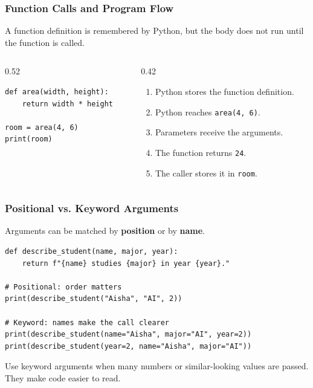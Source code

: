 \documentclass[aspectratio=169,10pt]{beamer}
\newcommand{\keyword}[1]{\textcolor{PrimaryBlue}{\textbf{#1}}}
\begin{document}
\begin{frame}[fragile]
\frametitle{Function Calls and Program Flow}
\small
A function definition is remembered by Python, but the body does not run until the function is called.

\vspace{0.15cm}
\begin{columns}[T,totalwidth=0.96\textwidth]
\begin{column}{0.52\textwidth}
\begin{lstlisting}[style=pycode]
def area(width, height):
    return width * height

room = area(4, 6)
print(room)
\end{lstlisting}
\end{column}
\begin{column}{0.42\textwidth}
\begin{tcolorbox}[lecturebox,title=Execution order]
\begin{enumerate}\small
  \item Python stores the function definition.
  \item Python reaches \texttt{area(4, 6)}.
  \item Parameters receive the arguments.
  \item The function returns \texttt{24}.
  \item The caller stores it in \texttt{room}.
\end{enumerate}
\end{tcolorbox}
\end{column}
\end{columns}
\end{frame}

\begin{frame}[fragile]
\frametitle{Positional vs. Keyword Arguments}
\small
Arguments can be matched by \keyword{position} or by \keyword{name}.

\vspace{0.1cm}
\begin{lstlisting}[style=pycode]
def describe_student(name, major, year):
    return f"{name} studies {major} in year {year}."

# Positional: order matters
print(describe_student("Aisha", "AI", 2))

# Keyword: names make the call clearer
print(describe_student(name="Aisha", major="AI", year=2))
print(describe_student(year=2, name="Aisha", major="AI"))
\end{lstlisting}

\begin{tcolorbox}[lecturebox,title=Beginner habit]
Use keyword arguments when many numbers or similar-looking values are passed. They make code easier to read.
\end{tcolorbox}
\end{frame}
\end{document}
